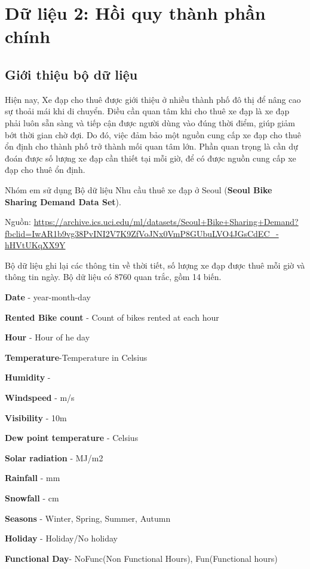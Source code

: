 \section{Dữ liệu 2: Hồi quy thành phần chính}

\subsection{Giới thiệu bộ dữ liệu}
Hiện nay, Xe đạp cho thuê được giới thiệu ở nhiều thành phố đô thị để nâng cao sự thoải mái khi di chuyển. Điều cần quan tâm khi cho thuê xe đạp là xe đạp phải luôn sẵn sàng và tiếp cận được người dùng vào đúng thời điểm, giúp giảm bớt thời gian chờ đợi. Do đó, việc đảm bảo  một nguồn cung cấp xe đạp cho thuê ổn định cho thành phố trở thành mối quan tâm lớn. Phần quan trọng là cần dự đoán được số lượng xe đạp cần thiết tại mỗi giờ, để có được nguồn cung cấp xe đạp cho thuê ổn định.

Nhóm em sử dụng Bộ dữ liệu Nhu cầu thuê xe đạp ở Seoul (\textbf{Seoul Bike Sharing Demand Data Set}).

Nguồn: \url{https://archive.ics.uci.edu/ml/datasets/Seoul+Bike+Sharing+Demand?fbclid=IwAR1b9vg38PvINI2V7K9ZfVoJNx0VmP8GUbuLVO4JGsCdEC_-hHVtUKqXX9Y}

Bộ dữ liệu ghi lại các thông tin về thời tiết, số lượng xe đạp được thuê mỗi giờ và thông tin ngày. Bộ dữ liệu có 8760 quan trắc, gồm 14 biến.

\textbf{Date} - year-month-day

\textbf{Rented Bike count} - Count of bikes rented at each hour

\textbf{Hour} - Hour of he day

\textbf{Temperature}-Temperature in Celsius

\textbf{Humidity} - %

\textbf{Windspeed} - m/s

\textbf{Visibility} - 10m

\textbf{Dew point temperature} - Celsius

\textbf{Solar radiation} - MJ/m2

\textbf{Rainfall} - mm

\textbf{Snowfall} - cm

\textbf{Seasons} - Winter, Spring, Summer, Autumn

\textbf{Holiday} - Holiday/No holiday

\textbf{Functional Day}- NoFunc(Non Functional Hours), Fun(Functional hours)



